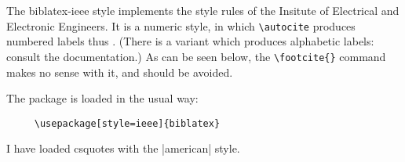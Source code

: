
\usepackage[style=american]{csquotes}
\usepackage[style=ieee,backend=biber]{biblatex}

\renewcommand{\showingstyle}{IEEE}

%
The \textsf{biblatex-ieee} style implements the style rules of the Insitute of Electrical and Electronic Engineers. It is a numeric style, in which \verb~\autocite~ produces numbered labels thus \cite{worman}. (There is a variant which produces alphabetic labels: consult the documentation.) As can be seen below, the \verb|\footcite{}| command makes no sense with it, and should be avoided.

\quad The package is loaded in the usual way:
\begin{verbatim}
     \usepackage[style=ieee]{biblatex}
\end{verbatim}
I have loaded \textsf{csquotes} with the |american| style.





